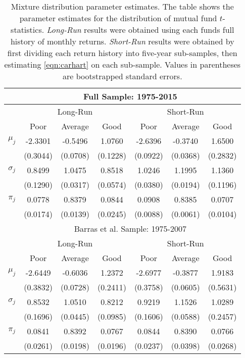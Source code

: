 		\begin{table}[p]
			\small
			\centering
			\begin{tabular}{*{7}{c}}
			\toprule
			& \multicolumn{6}{c}{Full Sample: 1975-2015} \\
			\midrule
			& \multicolumn{3}{c}{Long-Run} & \multicolumn{3}{c}{Short-Run} \\
			\cmidrule(l{2pt}r{2pt}){2-4} \cmidrule(l{2pt}r{2pt}){5-7}
			& Poor & Average & Good & Poor & Average & Good \\
			\midrule
			$\mu_j$ & -2.3301 & -0.5496 & 1.0760 & -2.6396 & -0.3740 & 1.6500 \\
			& (0.3044) & (0.0708) & (0.1228) & (0.0922) & (0.0368) & (0.2832) \\
			$\sigma_j$ & 0.8499 & 1.0475 & 0.8518 & 1.0246 & 1.1995 & 1.1360 \\
			& (0.1290) & (0.0317) & (0.0574) & (0.0380) & (0.0194) & (0.1196) \\
			$\pi_j$ & 0.0778 & 0.8379 & 0.0844 & 0.0908 & 0.8385 & 0.0707 \\
			& (0.0174) & (0.0139) & (0.0245) & (0.0088) & (0.0061) & (0.0104) \\
			\midrule
			& \multicolumn{6}{c}{Barras et al. Sample: 1975-2007} \\
			\midrule
			& \multicolumn{3}{c}{Long-Run} & \multicolumn{3}{c}{Short-Run} \\
			\cmidrule(l{2pt}r{2pt}){2-4} \cmidrule(l{2pt}r{2pt}){5-7}
			& Poor & Average & Good & Poor & Average & Good \\
			\midrule
			$\mu_j$ & -2.6449 & -0.6036 & 1.2372 & -2.6977 & -0.3877 & 1.9183 \\
			& (0.3832) & (0.0728) & (0.2411) & (0.3758) & (0.0605) & (0.5631) \\
			$\sigma_j$ & 0.8532 & 1.0510 & 0.8212 & 0.9219 & 1.1526 & 1.0289 \\
			& (0.1696) & (0.0445) & (0.0985) & (0.1606) & (0.0588) & (0.2457) \\
			$\pi_j$ & 0.0841 & 0.8392 & 0.0767 & 0.0844 & 0.8390 & 0.0766 \\
			& (0.0261) & (0.0198) & (0.0196) & (0.0237) & (0.0398) & (0.0268) \\
			\bottomrule
			\end{tabular}
			\captionsetup{position=below, font=footnotesize, justification=justified, width=0.77\linewidth}
			\caption[Mixture distribution parameter estimates]{Mixture distribution parameter estimates. The table shows the parameter estimates for the distribution of mutual fund $t$-statistics. \textit{Long-Run} results were obtained using each funds full history of monthly returns. \textit{Short-Run} results were obtained by first dividing each return history into five-year sub-samples, then estimating \eqref{eqn:carhart} on each sub-sample. Values in parentheses are bootstrapped standard errors.}
			\label{tab:main}
		\end{table}

